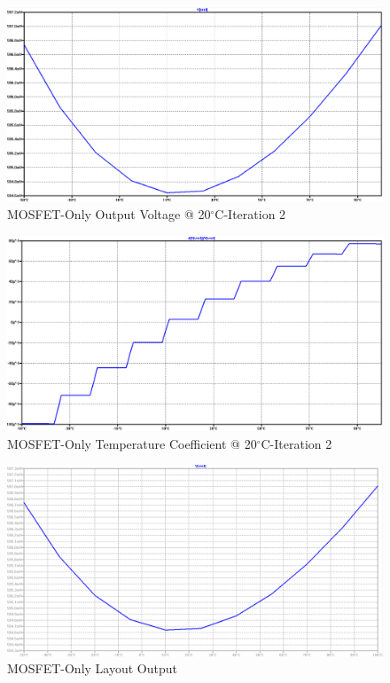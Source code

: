 \documentclass[conference]{IEEEtran}
\begin{document}
\begin{figure}[!htbp]
  	\centering
  	\includegraphics[scale=0.35]{images/appendix/mos-only2-vref.png}
  	\caption[output-z-meas]{MOSFET-Only Output Voltage @ 20$^{\circ}$C-Iteration 2}
  	\label{fig:mos-only2-vref}
	\end{figure}
\begin{figure}[!htbp]
  	\centering
  	\includegraphics[scale=0.35]{images/appendix/mos-only2-tempco.png}
  	\caption[output-z-meas]{MOSFET-Only Temperature Coefficient @ 20$^{\circ}$C-Iteration 2}
  	\label{fig:mos-only2-tempco}
	\end{figure}
\begin{figure}[!htbp]
  \centering
  \includegraphics[scale=0.35]{images/appendix/outputofelectric.png}
  \caption[outputofelectric]{MOSFET-Only Layout Output}
  \label{fig:outputofelectric}
\end{figure}
\end{document}
